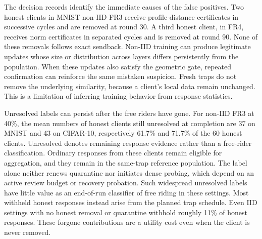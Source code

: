 \documentclass[journal]{IEEEtran}
\begin{document}
The decision records identify the immediate causes of the false positives.
Two honest clients in MNIST non-IID FR3 receive profile-distance
certificates in successive cycles and are removed at round 30. A third
honest client, in FR4, receives norm certificates in separated cycles
and is removed at round 90. None of these removals follows exact sendback.
Non-IID training can produce legitimate updates whose size or distribution
across layers differs persistently from the population. When these updates
also satisfy the geometric gate, repeated confirmation can reinforce the
same mistaken suspicion. Fresh traps do not remove the underlying
similarity, because a client's local data remain unchanged. This is a
limitation of inferring training behavior from response statistics.

Unresolved labels can persist after the free riders have gone.
For non-IID FR3 at 40\%, the mean numbers of honest clients still
unresolved at completion are 37 on MNIST and 43 on CIFAR-10, respectively
61.7\% and 71.7\% of the 60 honest clients. Unresolved denotes remaining
response evidence rather than a free-rider classification.
Ordinary responses from these clients remain
eligible for aggregation, and they remain in the same-trap reference
population. The label alone neither renews quarantine nor initiates dense
probing, which depend on an active review budget or recovery probation.
Such widespread unresolved labels have little value as an end-of-run
classifier of free riding in these settings.
Most withheld honest responses instead arise from the planned trap
schedule. Even IID settings with no honest removal or quarantine withhold
roughly 11\% of honest responses. These forgone contributions are a
utility cost even when the client is never removed.
\end{document}
